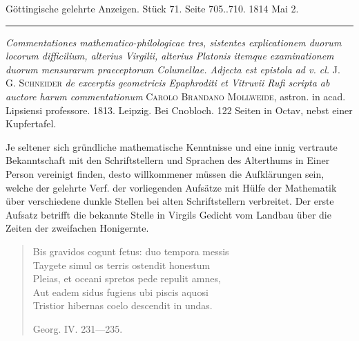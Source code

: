 \clearpage
{}
\hypertarget{native-572-lower}{}
\begin{center}\small Göttingische gelehrte Anzeigen. Stück 71. Seite 705..710. 1814 Mai 2.\\[3pt]\rule{.72\linewidth}{.3pt}\end{center}

\emph{Commentationes mathematico-philologicae tres, sistentes explicationem duorum locorum difficilium, alterius Virgilii, alterius Platonis itemque examinationem duorum mensurarum praeceptorum Columellae. Adjecta est epistola ad v. cl.} J. G. \textsc{Schneider} \emph{de excerptis geometricis Epaphroditi et Vitruvii Rufi scripta ab auctore harum commentationum} \textsc{Carolo Brandano Mollweide}, astron. in acad. Lipsiensi professore. 1813. Leipzig. Bei Cnobloch. 122 Seiten in Octav, nebst einer Kupfertafel.

Je seltener sich gründliche mathematische Kenntnisse und eine innig vertraute Bekanntschaft mit den Schriftstellern und Sprachen des Alterthums in Einer Person vereinigt finden, desto willkommener müssen die Aufklärungen sein, welche der gelehrte Verf. der vorliegenden Aufsätze mit Hülfe der Mathematik über verschiedene dunkle Stellen bei alten Schriftstellern verbreitet. Der erste Aufsatz betrifft die bekannte Stelle in Virgils Gedicht vom Landbau über die Zeiten der zweifachen Honigernte.

\begin{quote}\small Bis gravidos cogunt fetus: duo tempora messis \\ Taygete simul os terris ostendit honestum \\ Pleias, et oceani spretos pede repulit amnes, \\ Aut eadem sidus fugiens ubi piscis aquosi \\ Tristior hibernas coelo descendit in undas.

\hfill Georg. IV. 231---235. \end{quote}

